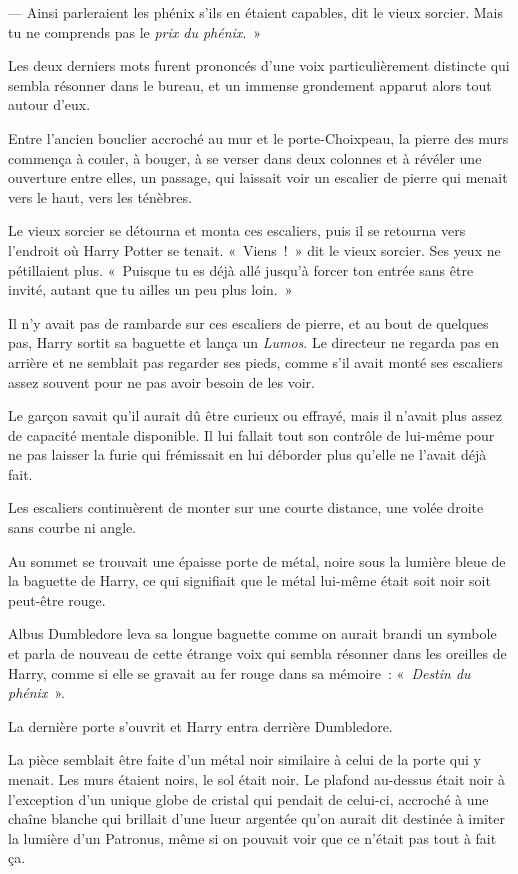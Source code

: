 --- Ainsi parleraient les phénix s'ils en étaient capables, dit le vieux sorcier.
Mais tu ne comprends pas le \emph{prix du phénix}.~»

Les deux derniers mots furent prononcés d'une voix particulièrement distincte qui sembla résonner dans le bureau, et un immense grondement apparut alors tout autour d'eux.

Entre l'ancien bouclier accroché au mur et le porte-Choixpeau, la pierre des murs commença à couler, à bouger, à se verser dans deux colonnes et à révéler une ouverture entre elles, un passage, qui laissait voir un escalier de pierre qui menait vers le haut, vers les ténèbres.

Le vieux sorcier se détourna et monta ces escaliers, puis il se retourna vers l'endroit où Harry Potter se tenait.
«~Viens~!~»
dit le vieux sorcier.
Ses yeux ne pétillaient plus.
«~Puisque tu es déjà allé jusqu'à forcer ton entrée sans être invité, autant que tu ailles un peu plus loin.~»

\later

Il n'y avait pas de rambarde sur ces escaliers de pierre, et au bout de quelques pas, Harry sortit sa baguette et lança un \emph{Lumos}.
Le directeur ne regarda pas en arrière et ne semblait pas regarder ses pieds, comme s'il avait monté ses escaliers assez souvent pour ne pas avoir besoin de les voir.

Le garçon savait qu'il aurait dû être curieux ou effrayé, mais il n'avait plus assez de capacité mentale disponible.
Il lui fallait tout son contrôle de lui-même pour ne pas laisser la furie qui frémissait en lui déborder plus qu'elle ne l'avait déjà fait.

Les escaliers continuèrent de monter sur une courte distance, une volée droite sans courbe ni angle.

Au sommet se trouvait une épaisse porte de métal, noire sous la lumière bleue de la baguette de Harry, ce qui signifiait que le métal lui-même était soit noir soit peut-être rouge.

Albus Dumbledore leva sa longue baguette comme on aurait brandi un symbole et parla de nouveau de cette étrange voix qui sembla résonner dans les oreilles de Harry, comme si elle se gravait au fer rouge dans sa mémoire~: «~\emph{Destin du phénix}~».

La dernière porte s'ouvrit et Harry entra derrière Dumbledore.

La pièce semblait être faite d'un métal noir similaire à celui de la porte qui y menait.
Les murs étaient noirs, le sol était noir.
Le plafond au-dessus était noir à l'exception d'un unique globe de cristal qui pendait de celui-ci, accroché à une chaîne blanche qui brillait d'une lueur argentée qu'on aurait dit destinée à imiter la lumière d'un Patronus, même si on pouvait voir que ce n'était pas tout à fait ça.

